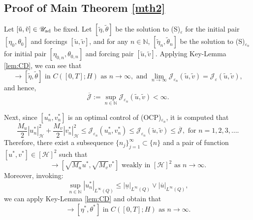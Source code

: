 \documentclass{sinst}
\numberwithin{equation}{section}
\theoremstyle{plain}
\theoremstyle{definition}
\def\N{\mathbb{N}}
\def\sH{\mathscr{H}}
\def\sJ{\mathscr{J}}
\def\sU{\mathscr{U}}
\def\ad{{\rm ad}}
\begin{document}
\subsection{Proof of Main Theorem \ref{mth2}} \label{proof2}
Let $[\tilde u, \tilde v] \in \sU_\ad$ be fixed. Let $[\tilde \eta, \tilde \theta]$ be the solution to (S)$_\varepsilon$ for the initial pair $[\eta_0, \theta_0]$ and forcings $[\tilde u, \tilde v]$, and for any $n \in \N$, $[\tilde \eta_n, \tilde \theta_n]$ be the solution to (S)$_{\varepsilon_n}$ for initial pair $[\eta_{0,n}, \theta_{0,n}]$ and forcing pair $[\tilde u, \tilde v]$. Applying Key-Lemma \ref{lem:CD}, we can see that
\begin{equation}
  [\tilde \eta_n, \tilde \theta_n] \to [\tilde \eta, \tilde \theta] \mbox{ in } C([0,T];H) \mbox{ as } n \to \infty, \mbox{ and } \lim_{n \to \infty} \sJ_{\varepsilon_n} (\tilde u, \tilde v) = \sJ_\varepsilon(\tilde u, \tilde v), \label{pr:CD1}
\end{equation} 
and hence,
\begin{equation}
  \overline{\sJ} := \sup_{n \in \N} \sJ_{\varepsilon_n} (\tilde u, \tilde v) < \infty.
\end{equation}

Next, since $[u_n^*, v_n^*]$ is an optimal control of (OCP)$_{\varepsilon_n}$, it is computed that
\begin{equation}
  \frac{M_u}{2}|u_n^*|_\sH^2 + \frac{M_v}{2}|v_n^*|_\sH^2 \leq \sJ_{\varepsilon_n} (u_n^*, v_n^*) \leq \sJ_{\varepsilon_n}(\tilde u, \tilde v) \leq \overline{\sJ}, \mbox{ for } n = 1,2,3,\dots.
\end{equation}
Therefore, there exist a subsequence $\{ n_j \}_{j=1}^\infty \subset \{ n \}$ and a pair of function $[u^*, v^*] \in [\sH]^2$ such that 
\begin{equation}
  [\sqrt{M_u} u_n^*, \sqrt{M_v} v_n^*] \to [\sqrt{M_u} u^*,\sqrt{M_v} v^*] \mbox{ weakly in } [\sH]^2 \mbox{ as } n \to \infty. \label{pr:CD2}
\end{equation}
Moreover, invoking:
\begin{equation}
  \sup_{n \in \N} |u_n^*|_{L^\infty(Q)} \leq |\underline{u}|_{L^\infty(Q)} \vee |\overline{u}|_{L^\infty(Q)},
\end{equation}
we can apply Key-Lemma \ref{lem:CD} and obtain that
\begin{equation}
  [\eta_n^*, \theta_n^*] \to [\eta^*, \theta^*] \mbox{ in } C([0,T];H) \mbox{ as } n \to \infty. \label{pr:CD3}
\end{equation}
\end{document}
